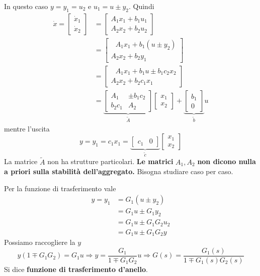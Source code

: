 \documentclass[10pt,a4paper]{book}
\begin{document}
In questo caso $y=y_1 =u_2$ e $u_1 =u\pm y_2$. Quindi
\begin{equation*}
\begin{aligned}
\dot{x} =\begin{bmatrix}
\dot{x}_1\\
\dot{x}_2
\end{bmatrix} & =\begin{bmatrix}
A_1 x_1 +b_1 u_1\\
A_2 x_2 +b_2 u_2
\end{bmatrix}\\
 & =\begin{bmatrix}
\ \ \ A_1 x_1 +b_1( u\pm y_2)\\
A_2 x_2 +b_2 y_1
\end{bmatrix}\\
 & =\begin{bmatrix}
\ \ \ A_1 x_1 +b_1 u\pm b_1 c_2 x_2\\
A_2 x_2 +b_2 c_1 x_1
\end{bmatrix}\\
 & =\underbrace{\begin{bmatrix}
A_1 & \pm b_1 c_2\\
b_2 c_1 & A_2
\end{bmatrix}
}_{\tilde{A}}\begin{bmatrix}
x_1\\
x_2
\end{bmatrix} +\underbrace{\begin{bmatrix}
b_1\\
0
\end{bmatrix}
}_{\tilde{b}} u
\end{aligned}
\end{equation*}
mentre l'uscita
\begin{equation*}
y=y_1 =c_1 x_1 =\underbrace{\begin{bmatrix}
c_1 & 0
\end{bmatrix}
}_{\tilde{c}}\begin{bmatrix}
x_1\\
x_2
\end{bmatrix}
\end{equation*}
La matrice $\tilde{A}$ non ha strutture particolari. \textbf{Le matrici }$A_1 ,A_2$\textbf{ non dicono nulla a priori sulla stabilità dell'aggregato.} Bisogna studiare caso per caso.

Per la funzione di trasferimento vale
\begin{equation*}
\begin{aligned}
y=y_1 & =G_1\left( u\pm y_2\right)\\
 & =G_1 u\pm G_1 y_2\\
 & =G_1 u\pm G_1 G_2 u_2\\
 & =G_1 u\pm G_1 G_2 y
\end{aligned}
\end{equation*}
Possiamo raccogliere la $y$
\begin{equation*}
y\left( 1\mp G_1 G_2\right) =G_1 u\Rightarrow y=\frac{G_1}{1\mp G_1 G_2} u\Rightarrow \boxed{G\left( s\right) =\frac{G_1\left( s\right)}{1\mp G_1\left( s\right) G_2\left( s\right)}}
\end{equation*}
Si dice \textbf{funzione di trasferimento d'anello}.
\end{document}
